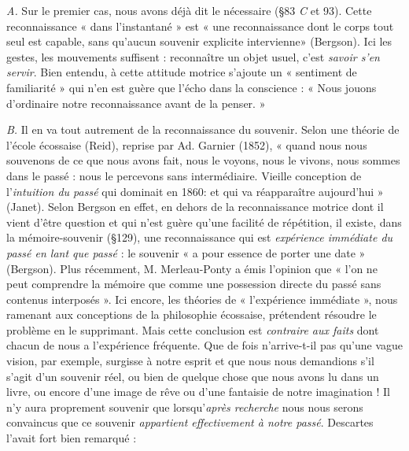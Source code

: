 {\it A.} Sur le premier cas, nous avons déjà dit le nécessaire (\S 83 {\it C} et
93). Cette reconnaissance « dans l’instantané » est « une reconnaissance
dont le corps tout seul est capable, sans qu'aucun souvenir
explicite intervienne» (Bergson). Ici les gestes, les mouvements
suffisent : reconnaître un objet usuel, c’est {\it savoir s’en servir}. Bien
entendu, à cette attitude motrice s’ajoute un « sentiment de familiarité »
qui n’en est guère que l’écho dans la conscience : « Nous jouons
d’ordinaire notre reconnaissance avant de la penser. »

{\it B.} Il en va tout autrement de la reconnaissance du souvenir. Selon
une théorie de l’école écossaise (Reid), reprise par Ad. Garnier
(1852), « quand nous nous souvenons de ce que nous avons fait, nous
le voyons, nous le vivons, nous sommes dans le passé : nous le percevons
sans intermédiaire. Vieille conception de l'{\it intuition du passé}
qui dominait en 1860: et qui va réapparaître aujourd’hui » (Janet).
Selon Bergson en effet, en dehors de la reconnaissance motrice
dont il vient d’être question et qui n’est guère qu’une facilité de répétition,
il existe, dans la mémoire-souvenir (\S 129), une reconnaissance
qui est {\it expérience immédiate du passé en lant que passé} : le souvenir
« a pour essence de porter une date » (Bergson). Plus récemment,
M. Merleau-Ponty a émis l’opinion que « l’on ne peut comprendre
la mémoire que comme une possession directe du passé sans contenus
interposés ». Ici encore, les théories de « l'expérience immédiate »,
nous ramenant aux conceptions de la philosophie écossaise, prétendent
résoudre le problème en le supprimant. Mais cette conclusion
est {\it contraire aux faits} dont chacun de nous a l’expérience fréquente.
Que de fois n’arrive-t-il pas qu’une vague vision, par exemple,
surgisse à notre esprit et que nous nous demandions s’il s’agit d’un
souvenir réel, ou bien de quelque chose que nous avons lu dans un
livre, ou encore d’une image de rêve ou d’une fantaisie de notre imagination !
Il n’y aura proprement souvenir que lorsqu’{\it après recherche}
nous nous serons convaincus que ce souvenir {\it appartient effectivement
à notre passé}. Descartes l’avait fort bien remarqué :

